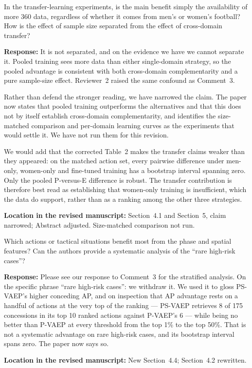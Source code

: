 \documentclass[11pt,a4paper]{article}
\newcommand{\response}[2]{%
  \begin{responsebox}
  \textbf{Response:}
  #1
  \end{responsebox}
  \begin{locationbox}
  \textbf{Location in the revised manuscript:}
  #2
  \end{locationbox}
}
\begin{document}
\begin{reviewbox}[Question 2]
In the transfer-learning experiments, is the main benefit simply the availability of more 360 data, regardless of whether it comes from men's or women's football? How is the effect of sample size separated from the effect of cross-domain transfer?
\end{reviewbox}
\response{It is not separated, and on the evidence we have we cannot separate it. Pooled training sees more data than either single-domain strategy, so the pooled advantage is consistent with both cross-domain complementarity and a pure sample-size effect. Reviewer~2 raised the same confound as Comment~3.

Rather than defend the stronger reading, we have narrowed the claim. The paper now states that pooled training outperforms the alternatives and that this does not by itself establish cross-domain complementarity, and identifies the size-matched comparison and per-domain learning curves as the experiments that would settle it. We have not run them for this revision.

We would add that the corrected Table~2 makes the transfer claims weaker than they appeared: on the matched action set, every pairwise difference under men-only, women-only and fine-tuned training has a bootstrap interval spanning zero. Only the pooled P-versus-E difference is robust. The transfer contribution is therefore best read as establishing that women-only training is insufficient, which the data do support, rather than as a ranking among the other three strategies.}{Section~4.1 and Section~5, claim narrowed; Abstract adjusted. Size-matched comparison not run.}

\begin{reviewbox}[Question 3]
Which actions or tactical situations benefit most from the phase and spatial features? Can the authors provide a systematic analysis of the ``rare high-risk cases''?
\end{reviewbox}
\response{Please see our response to Comment~3 for the stratified analysis. On the specific phrase ``rare high-risk cases'': we withdraw it. We used it to gloss PS-VAEP's higher conceding AP, and on inspection that AP advantage rests on a handful of actions at the very top of the ranking --- PS-VAEP retrieves 8 of 175 concessions in its top 10 ranked actions against P-VAEP's 6 --- while being no better than P-VAEP at every threshold from the top 1\% to the top 50\%. That is not a systematic advantage on rare high-risk cases, and its bootstrap interval spans zero. The paper now says so.}{New Section~4.4; Section~4.2 rewritten.}
\end{document}
